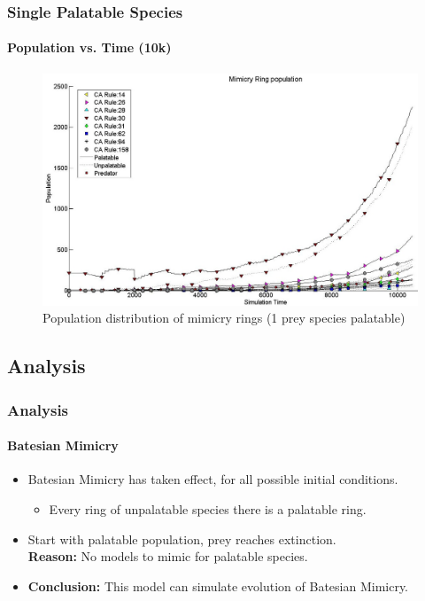 \frame
{
	\frametitle{Single Palatable Species}
	\framesubtitle{Population vs. Time (10k)}

	\begin{figure}[H]
		\centering
		\includegraphics[scale=0.25]{../tex/images/simTime10k-1Prey-p}
		\caption{Population distribution of mimicry rings (1 prey species palatable)}
		\label{fig:plot-1-prey-p}
	\end{figure}
}

\subsection{Analysis}

\frame
{
	\frametitle{Analysis}
	\framesubtitle{Batesian Mimicry}

	\begin{itemize}
		\item Batesian Mimicry has taken effect, for all possible initial conditions.
			\begin{itemize}
				\item Every ring of unpalatable species there is a palatable ring.
			\end{itemize}
	\end{itemize}

	\begin{itemize}
		\item Start with palatable population, prey reaches extinction.\\
		\textbf{Reason:} No models to mimic for palatable species.
	\end{itemize}

	\begin{itemize}
		\item \textbf{Conclusion:} This model can simulate evolution of Batesian Mimicry.
	\end{itemize}

}

